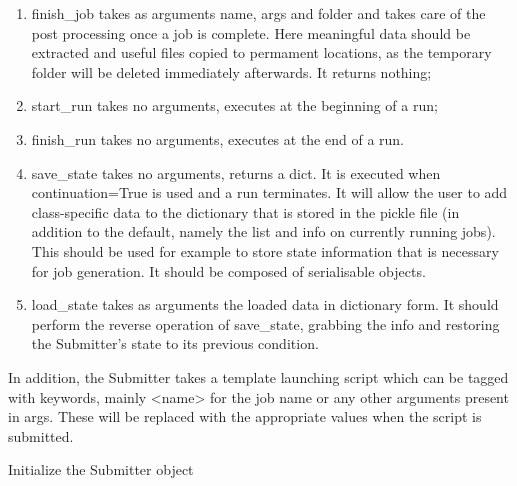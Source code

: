 \documentclass[letterpaper,10pt,english]{sphinxmanual}
\begin{document}
\begin{fulllineitems}
\begin{enumerate}
\item {} 
finish\_job takes as arguments name, args and folder and takes care of
the post processing once a job is complete. Here meaningful data should
be extracted and useful files copied to permament locations, as the
temporary folder will be deleted immediately afterwards. It returns
nothing;

\item {} 
start\_run takes no arguments, executes at the beginning of a run;

\item {} 
finish\_run takes no arguments, executes at the end of a run.

\item {} 
save\_state takes no arguments, returns a dict. It is executed when
continuation=True is used and a run terminates. It will allow the user
to add class-specific data to the dictionary that is stored in the
pickle file (in addition to the default, namely the list and info on
currently running jobs). This should be used for example to store state
information that is necessary for job generation. It should be composed
of serialisable objects.

\item {} 
load\_state takes as arguments the loaded data in dictionary form. It
should perform the reverse operation of save\_state, grabbing the info
and restoring the Submitter's state to its previous condition.

\end{enumerate}

In addition, the Submitter takes a template launching script which can
be tagged with keywords, mainly \textless{}name\textgreater{} for the job name or any other
arguments present in args. These will be replaced with the appropriate
values when the script is submitted.

Initialize the Submitter object


\end{fulllineitems}
\end{document}
